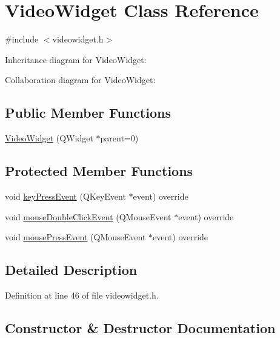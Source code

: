 \hypertarget{class_video_widget}{}\section{Video\+Widget Class Reference}
\label{class_video_widget}


{\ttfamily \#include $<$videowidget.\+h$>$}



Inheritance diagram for Video\+Widget\+:


Collaboration diagram for Video\+Widget\+:
\subsection*{Public Member Functions}
\begin{DoxyCompactItemize}
\item 
\mbox{\hyperlink{class_video_widget_a31e7897e4abd9733d45753e4a2e25882}{Video\+Widget}} (Q\+Widget $\ast$parent=0)
\end{DoxyCompactItemize}
\subsection*{Protected Member Functions}
\begin{DoxyCompactItemize}
\item 
void \mbox{\hyperlink{class_video_widget_a3efa34386c146603fd2785409eab9d0f}{key\+Press\+Event}} (Q\+Key\+Event $\ast$event) override
\item 
void \mbox{\hyperlink{class_video_widget_aff7ceebcce6eacc04cfbed16cb417158}{mouse\+Double\+Click\+Event}} (Q\+Mouse\+Event $\ast$event) override
\item 
void \mbox{\hyperlink{class_video_widget_a2ad2fa38f5cf82938f50eaba9ddc6173}{mouse\+Press\+Event}} (Q\+Mouse\+Event $\ast$event) override
\end{DoxyCompactItemize}


\subsection{Detailed Description}


Definition at line 46 of file videowidget.\+h.



\subsection{Constructor \& Destructor Documentation}
\mbox{\label{class_video_widget_a31e7897e4abd9733d45753e4a2e25882}} 
